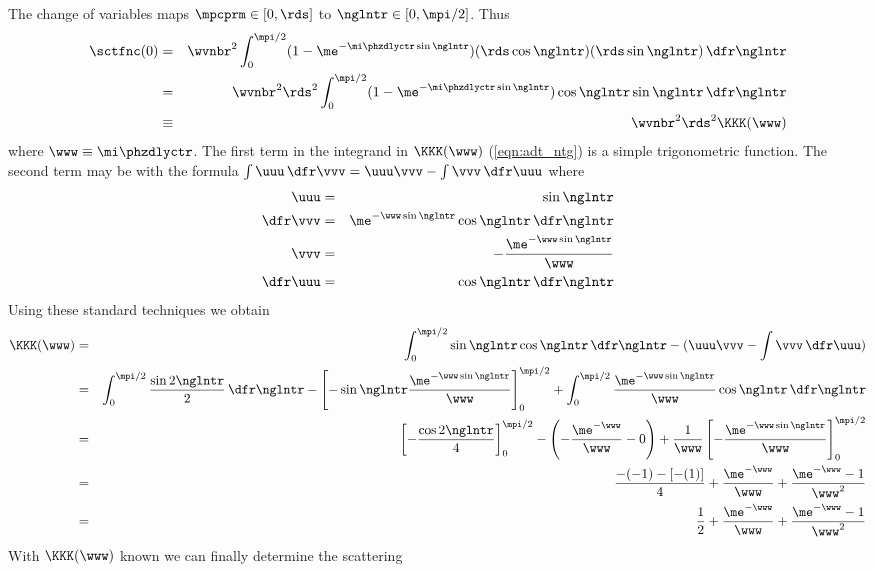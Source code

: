 \documentclass[12pt]{article}
\begin{document}
The change of variables maps $\mpcprm \in [0,\rds]$ to
$\nglntr \in [0,\mpi/2]$.
Thus
\begin{eqnarray}
\sctfnc(0)
& = & \wvnbr^{2} \int_{0}^{\mpi/2}
(1 - \me^{-\mi \phzdlyctr \sin \nglntr})
(\rds \cos \nglntr)
(\rds \sin \nglntr) \,\dfr \nglntr \nonumber \\
& = & \wvnbr^{2} \rds^{2} \int_{0}^{\mpi/2}
(1 - \me^{-\mi \phzdlyctr \sin \nglntr})
\cos \nglntr \sin \nglntr \,\dfr \nglntr \nonumber \\
& \equiv & \wvnbr^{2} \rds^{2} \KKK(\www) 
\label{eqn:adt_ntg}
\end{eqnarray}
where $\www \equiv \mi \phzdlyctr$.
The first term in the integrand in $\KKK(\www)$ (\ref{eqn:adt_ntg}) is
a simple trigonometric function. 
The second term may be  with the formula 
$\int \uuu \,\dfr \vvv = \uuu \vvv - \int \vvv \,\dfr \uuu$
where
\begin{eqnarray}
\uuu & = & \sin \nglntr \nonumber \\
\dfr \vvv & = & \me^{-\www \sin \nglntr} \cos \nglntr \,\dfr \nglntr \nonumber \\
\vvv & = & -\frac{\me^{-\www \sin \nglntr}}{\www} \nonumber \\
\dfr \uuu & = & \cos \nglntr \,\dfr\nglntr
\label{eqn:cov_prt_ntg_dfn}
\end{eqnarray}
Using these standard techniques we obtain
\begin{eqnarray}
\KKK(\www) 
& = & 
\int_{0}^{\mpi/2} \sin \nglntr \cos \nglntr \,\dfr\nglntr
- (\uuu \vvv - \int \vvv \,\dfr \uuu) \nonumber \\
& = & 
\int_{0}^{\mpi/2} \frac{\sin 2 \nglntr}{2} \,\dfr\nglntr
- \left[ - \sin \nglntr 
\frac{\me^{-\www \sin \nglntr}}{\www} \right]_{0}^{\mpi/2}
+ \int_{0}^{\mpi/2} \frac{\me^{-\www \sin \nglntr}}{\www} 
\cos \nglntr \,\dfr\nglntr \nonumber \\
& = & 
\left[ - \frac{\cos 2 \nglntr}{4} \right]_{0}^{\mpi/2} -
\left( - \frac{\me^{-\www}}{\www} - 0 \right) +
\frac{1}{\www} \left[
- \frac{\me^{-\www \sin \nglntr}}{\www} \right]_{0}^{\mpi/2} \nonumber \\
& = & 
\frac{-(-1)-[-(1)]}{4} +
\frac{\me^{-\www}}{\www} +
\frac{\me^{-\www} - 1}{\www^{2}} \nonumber \\
& = & 
\frac{1}{2} +
\frac{\me^{-\www}}{\www} +
\frac{\me^{-\www} - 1}{\www^{2}} 
\label{eqn:adt_kkk_sln}
\end{eqnarray}
With $\KKK(\www)$ known we can finally determine the scattering
\end{document}
